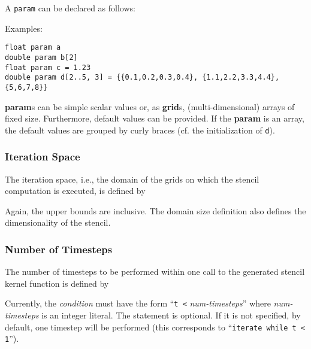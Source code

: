 \bigskip

\noindent A \texttt{param} can be declared as follows:

\medskip
\noindent Examples:
\begin{lstlisting}[language=stencil]
float param a
double param b[2]
float param c = 1.23
double param d[2..5, 3] = {{0.1,0.2,0.3,0.4}, {1.1,2.2,3.3,4.4}, {5,6,7,8}}
\end{lstlisting}

\textbf{param}s can be simple scalar values or, as \textbf{grid}s, (multi-dimensional) arrays of fixed size.
Furthermore, default values can be provided. If the \textbf{param} is an array, the default values are grouped
by curly braces (cf. the initialization of \texttt{d}).


\subsubsection{Iteration Space}

The iteration space, i.e., the domain of the grids on which the stencil computation is executed, is defined by

\noindent Again, the upper bounds are inclusive. The domain size definition also defines the dimensionality of the stencil.


\subsubsection{Number of Timesteps}

The number of timesteps to be performed within one call to the generated stencil kernel function is defined by

\noindent Currently, the \textit{condition} must have the form ``\texttt{t <} \textit{num-timesteps}'' where
\textit{num-timesteps} is an integer literal.
The statement is optional. If it is not specified, by default, one timestep will be performed (this corresponds to
``\texttt{iterate while t < 1}'').


